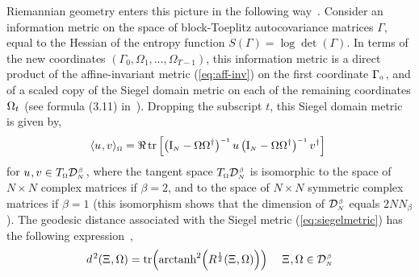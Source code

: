\documentclass[draftclsnofoot]{IEEEtran}
\begin{document}
Riemannian geometry enters this picture in the following way~\cite{jeuris1}\cite{yannthesis}. Consider an information metric  
on the space of block-Toeplitz autocovariance matrices $\Gamma$, equal to the Hessian of the entropy function $S(\Gamma) = \log\det(\Gamma)$. In terms of the new coordinates $(\Gamma_{\scriptscriptstyle 0},\Omega_{\scriptscriptstyle 1},\ldots, \Omega_{\scriptscriptstyle T-1})$, this information metric is a direct product of the affine-invariant metric (\ref{eq:aff-inv}) on the first coordinate $\Gamma_{\scriptscriptstyle 0\hspace{0.03cm}}$, and of a scaled copy of the Siegel domain metric on each of the remaining coordinates $\Omega_t\hspace{0.03cm}$ (see formula (3.11) in~\cite{jeuris1}). Dropping the subscript $t$, this Siegel domain metric is given by,
\begin{equation}\label{eq:siegelmetric}   
\!\!\langle u\hspace{0.02cm},v\rangle_{\scriptscriptstyle \Omega} =  \Re\,\mathrm{tr}\left[ \left(\mathrm{I}_{\scriptscriptstyle N} - \Omega\Omega^\dagger\right)^{\scriptscriptstyle -1}u\left(\mathrm{I}_{\scriptscriptstyle N} - \Omega\Omega^\dagger\right)^{\scriptscriptstyle -1}v^\dagger\right]
\end{equation}
for $u\hspace{0.02cm},v \in T_{\scriptscriptstyle \Omega}\mathcal{D}^{\hspace{0.02cm}\scriptscriptstyle \beta}_{\scriptscriptstyle N}\hspace{0.03cm}$,
where the tangent space $T_{\scriptscriptstyle \Omega}\mathcal{D}^{\hspace{0.02cm}\scriptscriptstyle \beta}_{\scriptscriptstyle N}$ is isomorphic to the space of $N \times N$ complex matrices if $\beta = 2$, and to the space of $N \times N$ symmetric complex matrices if $\beta = 1$ (this isomorphism shows that the dimension of $\mathcal{D}^{\hspace{0.02cm}\scriptscriptstyle \beta}_{\scriptscriptstyle N}$ equals $2NN_\beta$). The geodesic distance associated with the Siegel metric (\ref{eq:siegelmetric}) has the following expression~\cite{jeuris1}\cite{yannthesis},
\begin{equation} \label{eq:siegeldistance}
 d^{\hspace{0.03cm} 2}(\Xi\hspace{0.02cm},\Omega) = \mathrm{tr}\!\left(\mathrm{arctanh}^2\!\left(R^{\scriptscriptstyle \frac{1}{2}}(\Xi\hspace{0.02cm},\Omega)\right)\right)
 \hspace{0.4cm}
\Xi\hspace{0.02cm},\Omega \in \mathcal{D}^{\hspace{0.02cm}\scriptscriptstyle \beta}_{\scriptscriptstyle N}
\end{equation} 
\end{document}
